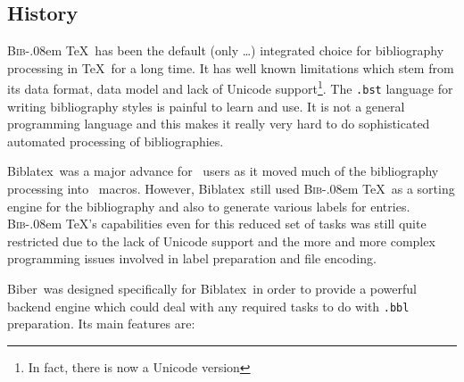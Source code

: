 \documentclass{ltxdockit}
\def\BibTeX{\textsc{Bib}\kern-.08em \TeX}
\newcommand*{\biber}{Biber\xspace}
\newcommand*{\biblatex}{Biblatex\xspace}
\begin{document}
\subsection{History}

\BibTeX\ has been the default (only \ldots) integrated choice for
bibliography processing in \TeX\ for a long time. It has well known
limitations which stem from its data format, data model and lack of Unicode
support\footnote{In fact, there is now a Unicode version}. The
\verb+.bst+ language for writing bibliography styles is painful to learn
and use. It is not a general programming language and this makes it really
very hard to do sophisticated automated processing of bibliographies.

\biblatex\ was a major advance for \latex\ users as it moved much
of the bibliography processing into \latex\ macros. However,
\biblatex\ still used \BibTeX\ as a sorting engine for the
bibliography and also to generate various labels for
entries. \BibTeX's capabilities even for this reduced set of
tasks was still quite restricted due to the lack of Unicode support and
the more and more complex programming issues involved in label
preparation and file encoding.

\biber\ was designed specifically for \biblatex\ in order to
provide a powerful backend engine which could deal with any required
tasks to do with \verb+.bbl+ preparation. Its main features are:
\end{document}
